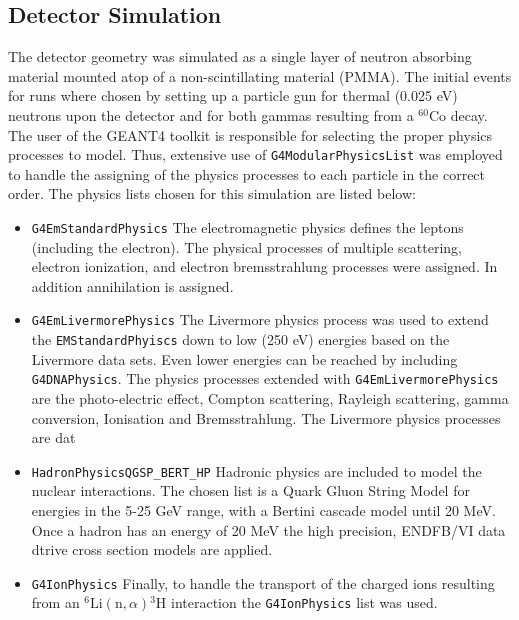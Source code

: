 \documentclass{anstrans}
\newcommand{\iso}[2]{${}^{#2}${#1}}
\begin{document}
\subsection{Detector Simulation}
The detector geometry was simulated as a single layer of neutron absorbing material mounted atop of a non-scintillating material (PMMA).
The initial events for runs where chosen by setting up a particle gun for thermal (0.025 eV) neutrons upon the detector and for both gammas resulting from a \iso{Co}{60} decay.
The user of the GEANT4 toolkit is responsible for selecting the proper physics processes to model.
Thus, extensive use of \verb+G4ModularPhysicsList+ was employed to handle the assigning of the physics processes to each particle in the correct order.
The physics lists chosen for this simulation are listed below:
\begin{itemize}
   \item \verb+G4EmStandardPhysics+ The electromagnetic physics defines the leptons (including the electron). The physical processes of multiple scattering, electron ionization, and electron bremsstrahlung processes were assigned.  In addition annihilation is assigned.
    \item \verb+G4EmLivermorePhysics+ The Livermore physics process was used to extend the \verb+EMStandardPhyiscs+ down to low (250 eV) energies based on the Livermore data sets. Even lower energies can be reached by including \verb+G4DNAPhysics+. The physics processes extended with \verb+G4EmLivermorePhysics+ are the photo-electric effect, Compton scattering, Rayleigh scattering, gamma conversion, Ionisation and Bremsstrahlung. The Livermore physics processes are dat 
    \item \verb+HadronPhysicsQGSP_BERT_HP+ Hadronic physics are included to model the nuclear interactions. The chosen list is a Quark Gluon String Model for energies in the 5-25 GeV range, with a Bertini cascade model until 20 MeV.  Once a hadron has an energy of 20 MeV the high precision, ENDFB/VI data dtrive cross section models are applied.
    \item \verb+G4IonPhysics+ Finally, to handle the transport of the charged ions resulting from an ${}^6\text{Li}(\text{n},\alpha){}^{3}\text{H}$ interaction the \verb+G4IonPhysics+ list was used.
\end{itemize}
\end{document}
